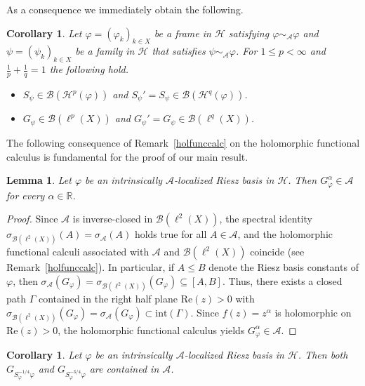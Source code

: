 \documentclass{amsart}
\newtheorem{lem.}[theorem]{Lemma}
\newtheorem{cor.}[theorem]{Corollary}
\def\Hil{\mathcal{H}}
\newcommand{\B}[0]{{\mathcal{B}}}
\newcommand{\A}[0]{{\mathcal{A}}}
\renewcommand{\H}{{\mathcal{H}}}
\begin{document}
As a consequence we immediately obtain the following.

\begin{cor.}\label{SGadoints}
Let $\varphi = (\varphi_k)_{k\in X}$ be a frame in $\Hil$ satisfying $\varphi\sim_{\A}\varphi$ and $\psi = (\psi_k)_{k\in X}$ be a family in $\H$ that satisfies $\psi\sim_\A \varphi$. For $1\leq p <\infty$ and $\frac{1}{p}+\frac{1}{q} = 1$ the following hold. 
\begin{itemize}
\item[(i)] $S_{\psi} \in \B(\H^p(\varphi))$ and $S_{\psi}' = S_{\psi}\in \B(\H^q(\varphi))$.
\item[(ii)] $G_{\psi} \in \B(\ell^p(X))$ and $G_{\psi}' = G_{\psi} \in \B(\ell^q(X))$.
\end{itemize}
\end{cor.}

The following consequence of Remark~\ref{holfunccalc} on the holomorphic functional calculus is fundamental for the proof of our main result.

\begin{lem.}\label{alpha}
Let $\varphi$ be an intrinsically $\A$-localized Riesz basis in $\Hil$. Then $G_{\varphi}^{\alpha} \in \A$ for every $\alpha \in \mathbb{R}$.
\end{lem.}

\begin{proof}
Since $\A$ is inverse-closed in $\B(\ell^2(X))$, the spectral identity $ \sigma_{\B(\ell^2(X))}(A)=\sigma_{\mathcal{A}}(A)$ holds true for all $A\in \A$, and the holomorphic functional calculi associated with $\A$ and $\B(\ell^2(X))$ coincide (see Remark~\ref{holfunccalc}). In particular, if $A\leq B$ denote the Riesz basis constants of $\varphi$, then $\sigma_{\A}(G_{\varphi}) = \sigma_{\B(\ell^2(X))}(G_{\varphi}) \subseteq [A,B]$. Thus, there exists a closed path $\Gamma$ contained in the right half plane $\text{Re}(z)>0$ with $\sigma_{\B(\ell^2(X))}(G_{\varphi}) = \sigma_{\A}(G_{\varphi}) \subset \text{int}(\Gamma)$. Since $f(z) = z^{\alpha}$ is holomorphic on $\text{Re}(z)>0$, the holomorphic functional calculus yields $G_{\varphi}^{\alpha}\in \A$.  
\end{proof}

\begin{cor.}\label{easycorollary}
Let $\varphi$ be an intrinsically $\A$-localized Riesz basis in $\Hil$. Then both $G_{S_{\varphi}^{-1/4}\varphi}$ and $G_{S_{\varphi}^{-3/4}\varphi}$ are contained in $\A$.
\end{cor.}
\end{document}
